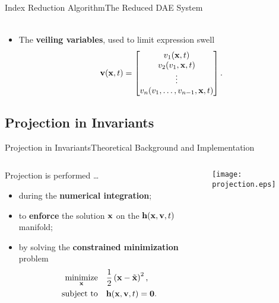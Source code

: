 \begin{frame}{Index Reduction Algorithm}{The Reduced \ac{DAE} System}
\begin{itemize}[<+->]
\begin{equation*}
\begin{array}{l}
    \end{array}
    \end{equation*}
    \item The \textbf{veiling variables}, used to limit expression swell
    \begin{equation*}
        \mathbf{v}(\mathbf{x}, t) = \begin{bmatrix}
            v_{1}(\mathbf{x}, t) \\
            v_{2}(v_{1}, \mathbf{x}, t) \\
            \vdots \\
            v_{n}(v_{1}, \dots, v_{n-1}, \mathbf{x}, t)
        \end{bmatrix} \text{.}
    \end{equation*}
  \end{itemize}
\end{frame}

\subsection{Projection in Invariants}

\begin{frame}{Projection in Invariants}{Theoretical Background and Implementation}
  \begin{columns}
    \begin{column}[c]{0.6\textwidth}
      Projection is performed \dots
      \begin{itemize}
        \item during the \textbf{numerical integration};
        \item to \textbf{enforce} the solution $\mathbf{x}$ on the $\mathbf{h}(\mathbf{x}, \mathbf{v}, t)$ manifold;
        \item by solving the \textbf{constrained minimization} problem
          \begin{align*}
            \underset{\mathbf{x}}{\text{minimize}} \quad &\dfrac{1}{2}\left(\mathbf{x} - \tilde{\mathbf{x}}\right)^2 \text{,} \\
            \text{subject to} \quad &\mathbf{h}(\mathbf{x}, \mathbf{v}, t) = \mathbf{0} \text{.}
          \end{align*}
        \end{itemize}
      \end{column}
      \begin{column}[c]{0.4\textwidth}
        \hspace{-0.2\textwidth}\texttt{[image: projection.eps]}
      \end{column}
    \end{columns}
    \vspace{1.0em}
\end{frame}

